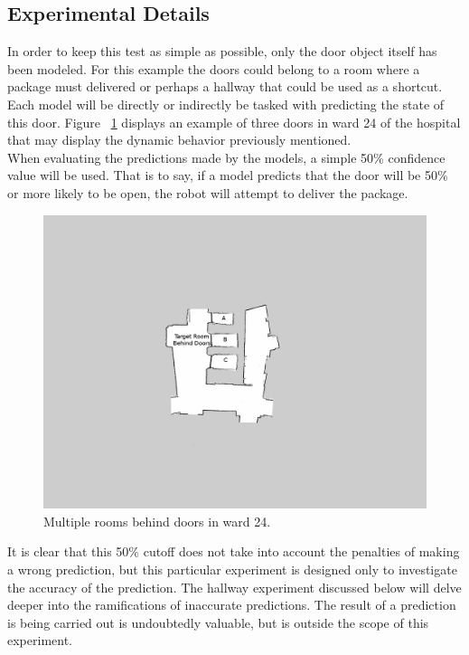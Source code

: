   \subsection{ Experimental Details }

  In order to keep this test as simple as possible, only the door
  object itself has been modeled. For this example the doors could belong to a room where a
  package must delivered or perhaps a hallway that could be used as a
  shortcut. Each model will be directly or indirectly be tasked with
  predicting the state of this door. Figure ~\ref{figure:ward_24_door}
  displays an example of three
  doors in ward 24 of the hospital that may display the dynamic behavior
  previously mentioned. \\

  When evaluating the predictions made by the models, a simple 50\% confidence
  value will be used. That is to say, if a model predicts that the door will
  be 50\% or more likely to be open, the robot will attempt to
  deliver the package. \\

  \begin{figure}[!htb]
    \centering
    \includegraphics[width=\linewidth]{images/ward_24_door.png}
    \caption{Multiple rooms behind doors in ward 24.}
    \label{figure:ward_24_door}
  \end{figure}

  It is clear that this 50\% cutoff does not take into account the penalties
  of making a wrong prediction, but this particular experiment is designed only to
  investigate the accuracy of the prediction. The hallway experiment discussed
  below will delve deeper into the ramifications of inaccurate
  predictions. The result of a prediction is
  being carried out is undoubtedly valuable, but is outside the scope of this
  experiment. \\

